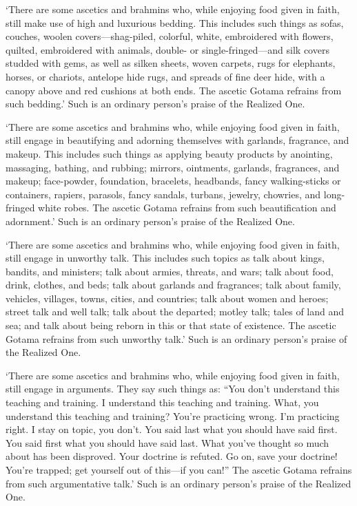 \documentclass[12pt,openany]{book}%
\begin{document}
‘There are some ascetics and brahmins who, while enjoying food given in faith, still make use of high and luxurious bedding. This includes such things as sofas, couches, woolen covers—shag-piled, colorful, white, embroidered with flowers, quilted, embroidered with animals, double- or single-fringed—and silk covers studded with gems, as well as silken sheets, woven carpets, rugs for elephants, horses, or chariots, antelope hide rugs, and spreads of fine deer hide, with a canopy above and red cushions at both ends. The ascetic Gotama refrains from such bedding.’ Such is an ordinary person’s praise of the Realized One. 

‘There are some ascetics and brahmins who, while enjoying food given in faith, still engage in beautifying and adorning themselves with garlands, fragrance, and makeup. This includes such things as applying beauty products by anointing, massaging, bathing, and rubbing; mirrors, ointments, garlands, fragrances, and makeup; face-powder, foundation, bracelets, headbands, fancy walking-sticks or containers, rapiers, parasols, fancy sandals, turbans, jewelry, chowries, and long-fringed white robes. The ascetic Gotama refrains from such beautification and adornment.’ Such is an ordinary person’s praise of the Realized One. 

‘There are some ascetics and brahmins who, while enjoying food given in faith, still engage in unworthy talk. This includes such topics as talk about kings, bandits, and ministers; talk about armies, threats, and wars; talk about food, drink, clothes, and beds; talk about garlands and fragrances; talk about family, vehicles, villages, towns, cities, and countries; talk about women and heroes; street talk and well talk; talk about the departed; motley talk; tales of land and sea; and talk about being reborn in this or that state of existence. The ascetic Gotama refrains from such unworthy talk.’ Such is an ordinary person’s praise of the Realized One. 

‘There are some ascetics and brahmins who, while enjoying food given in faith, still engage in arguments. They say such things as: “You don’t understand this teaching and training. I understand this teaching and training. What, you understand this teaching and training? You’re practicing wrong. I’m practicing right. I stay on topic, you don’t. You said last what you should have said first. You said first what you should have said last. What you’ve thought so much about has been disproved. Your doctrine is refuted. Go on, save your doctrine! You’re trapped; get yourself out of this—if you can!” The ascetic Gotama refrains from such argumentative talk.’ Such is an ordinary person’s praise of the Realized One. 
\end{document}
